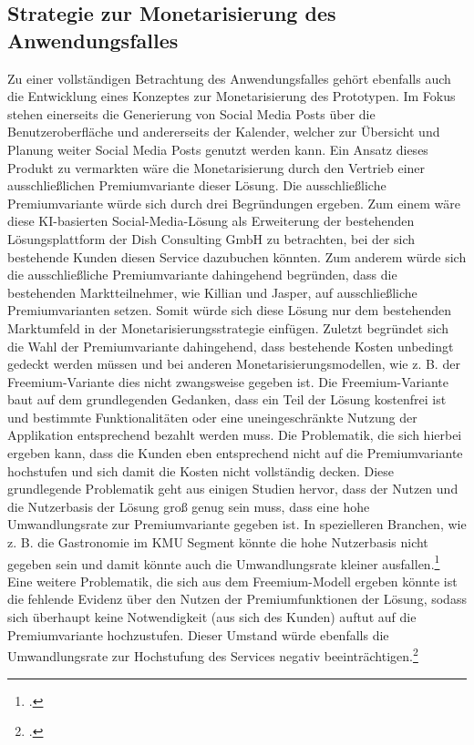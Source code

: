 \subsection{Strategie zur Monetarisierung des Anwendungsfalles}
Zu einer vollständigen Betrachtung des Anwendungsfalles gehört ebenfalls auch die Entwicklung eines Konzeptes zur Monetarisierung des Prototypen.
Im Fokus stehen einerseits die Generierung von Social Media Posts über die Benutzeroberfläche und andererseits der Kalender, welcher zur Übersicht und Planung weiter Social Media Posts genutzt werden kann.
Ein Ansatz dieses Produkt zu vermarkten wäre die Monetarisierung durch den Vertrieb einer ausschließlichen Premiumvariante dieser Lösung.
Die ausschließliche Premiumvariante würde sich durch drei Begründungen ergeben.
Zum einem wäre diese KI-basierten Social-Media-Lösung als Erweiterung der bestehenden Lösungsplattform der Dish Consulting GmbH zu betrachten, bei der sich bestehende Kunden diesen Service dazubuchen könnten.
Zum anderem würde sich die ausschließliche Premiumvariante dahingehend begründen, dass die bestehenden Marktteilnehmer, wie Killian und Jasper, auf ausschließliche Premiumvarianten setzen.
Somit würde sich diese Lösung nur dem bestehenden Marktumfeld in der Monetarisierungsstrategie einfügen.
Zuletzt begründet sich die Wahl der Premiumvariante dahingehend, dass bestehende Kosten unbedingt gedeckt werden müssen und bei anderen Monetarisierungsmodellen, wie z. B. der Freemium-Variante dies nicht zwangsweise gegeben ist.
Die Freemium-Variante baut auf dem grundlegenden Gedanken, dass ein Teil der Lösung kostenfrei ist und bestimmte Funktionalitäten oder eine uneingeschränkte Nutzung der Applikation entsprechend bezahlt werden muss.
Die Problematik, die sich hierbei ergeben kann, dass die Kunden eben entsprechend nicht auf die Premiumvariante hochstufen und sich damit die Kosten nicht vollständig decken.
Diese grundlegende Problematik geht aus einigen Studien hervor, dass der Nutzen und die Nutzerbasis der Lösung groß genug sein muss, dass eine hohe Umwandlungsrate zur Premiumvariante gegeben ist.
In spezielleren Branchen, wie z. B. die Gastronomie im \ac{KMU} Segment könnte die hohe Nutzerbasis nicht gegeben sein und damit könnte auch die Umwandlungsrate kleiner ausfallen.\footcite{kumar2014freemium}
Eine weitere Problematik, die sich aus dem Freemium-Modell ergeben könnte ist die fehlende Evidenz über den Nutzen der Premiumfunktionen der Lösung, sodass sich überhaupt keine Notwendigkeit (aus sich des Kunden) auftut auf die Premiumvariante hochzustufen.
Dieser Umstand würde ebenfalls die Umwandlungsrate zur Hochstufung des Services negativ beeinträchtigen.\footcite{kim2018perceived}

